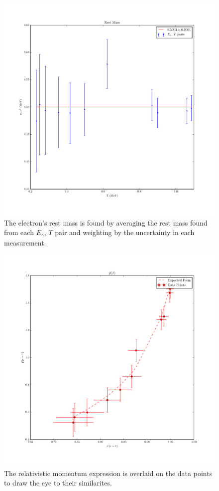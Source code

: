 \documentclass[reprint, nobibnotes, amssymb, amsmath, amsfonts, physics, mathtools, mathrsfs, floatfix]{revtex4-1}
\begin{document}
\begin{widetext}
      \begin{figure}[h]
        \centering
        \includegraphics[width=\linewidth]{../plots/rest_mass.pdf}
        \caption{The electron's rest mass is found by averaging the rest mass found from each $E_\gamma$, $T$ pair and weighting by the uncertainty in each measurement. \label{fig:mass_avg}}
      \end{figure}

      \begin{figure}[h]
        \centering
        \includegraphics[width=\linewidth]{../plots/momvsspeed.pdf}
        \caption{The relativistic momentum expression is overlaid on the data points to draw the eye to their similarites. \label{fig:momvsspeed}}
      \end{figure}


\end{widetext}
\end{document}
